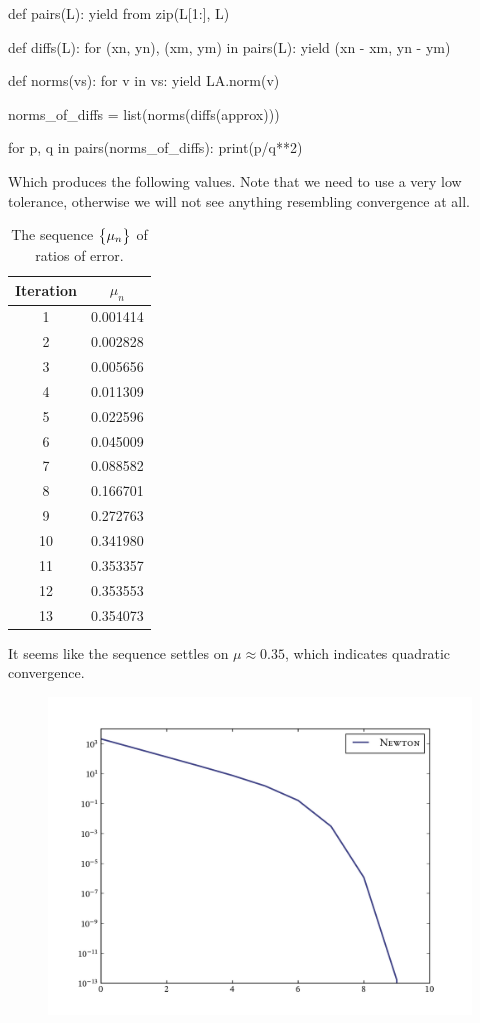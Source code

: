 \documentclass[12pt]{article}
\begin{document}
\begin{multicols}{2}
\begin{python}[
        caption={Computing the sequence of ratios}
    ]
def pairs(L):
    yield from zip(L[1:], L)

def diffs(L):
    for (xn, yn), (xm, ym) in pairs(L):
        yield (xn - xm, yn - ym)

def norms(vs):
        for v in vs: yield LA.norm(v)

norms_of_diffs = list(norms(diffs(approx)))

for p, q in pairs(norms_of_diffs):
    print(p/q**2)
    \end{python}
Which produces the following values.
Note that we need to use a very low tolerance,
otherwise we will not see anything resembling convergence at all.
    \begin{table}[H]
        \centering
        \caption{The sequence $\big\{ \mu_n \big\}$ of ratios of error.}
        \begin{tabular}{c S[table-format=1.6]}
            \hline\hline
            \bfseries Iteration & $\mu_n$ \\
              & 0.001414\\
            2  & 0.002828\\
            3  & 0.005656\\
            4  & 0.011309\\
            5  & 0.022596\\
            6  & 0.045009\\
            7  & 0.088582\\
            8  & 0.166701\\
            9  & 0.272763\\
            10 & 0.341980\\
            11 & 0.353357\\
            12 & 0.353553\\
            13 & 0.354073\\
            \hline
        \end{tabular}
    \end{table}\noindent
    It seems like the sequence settles on $\mu \approx 0.35$,
    which indicates quadratic convergence.
    \begin{figure}[H]
        \centering
        \includegraphics[width=\columnwidth]{f_norms}

\end{figure}
\end{multicols}
\end{document}
